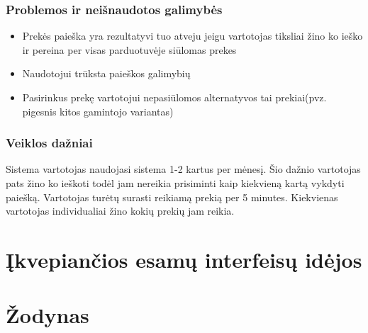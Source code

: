 \documentclass[oneside]{VUMIFPSkursinis}
\begin{document}
	\subsubsection{Problemos ir neišnaudotos galimybės}
		\begin{itemize}
			\item{Prekės paieška yra rezultatyvi tuo atveju jeigu vartotojas tiksliai žino ko ieško ir pereina per visas parduotuvėje siūlomas prekes}
			\item{Naudotojui trūksta paieškos galimybių}
			\item{Pasirinkus prekę vartotojui nepasiūlomos alternatyvos tai prekiai(pvz. pigesnis kitos gamintojo variantas)}
		\end{itemize}
	\subsubsection{Veiklos dažniai}
		Sistema vartotojas naudojasi sistema 1-2 kartus per mėnesį. 
		Šio dažnio vartotojas pats žino ko ieškoti todėl jam nereikia prisiminti kaip kiekvieną kartą vykdyti paiešką. 
		Vartotojas turėtų surasti reikiamą prekią per 5 minutes. 
		Kiekvienas vartotojas individualiai žino kokių prekių jam reikia.

\section{Įkvepiančios esamų interfeisų idėjos}

\section{Žodynas}
\end{document}
